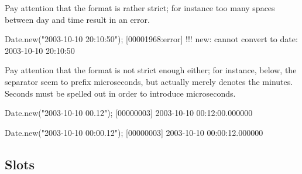 Pay attention that the format is rather strict; for instance too many spaces
between day and time result in an error.

\begin{urbiscript}
Date.new("2003-10-10  20:10:50");
[00001968:error] !!! new: cannot convert to date: 2003-10-10  20:10:50
\end{urbiscript}

Pay attention that the format is not strict enough either; for instance,
below, the  separator seem to prefix microseconds, but actually
merely denotes the minutes.  Seconds must be spelled out in order to
introduce microseconds.

\begin{urbiscript}
Date.new("2003-10-10 00.12");
[00000003] 2003-10-10 00:12:00.000000

Date.new("2003-10-10 00:00.12");
[00000003] 2003-10-10 00:00:12.000000
\end{urbiscript}

\subsection{Slots}

